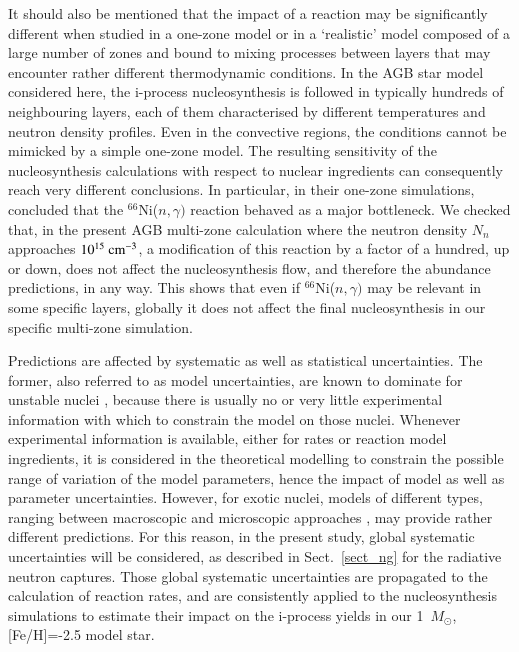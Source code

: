 \documentclass{aa}
\def\Msun{$M_{\odot}$}
\begin{document}
It should also be mentioned that the impact of a reaction may be significantly different when studied in a one-zone model or in a `realistic' model composed of a large number of zones and bound to mixing processes between layers that may encounter rather different thermodynamic conditions. In the AGB star model considered here, the i-process nucleosynthesis is followed in typically hundreds of neighbouring layers, each of them characterised by different temperatures and neutron density profiles. Even in the convective regions, the conditions cannot be mimicked by a simple one-zone model. The resulting sensitivity of the nucleosynthesis calculations with respect to nuclear ingredients can consequently reach very different conclusions. In particular, in their one-zone simulations, \citet{McKay19} concluded that the $^{66}$Ni($n,\gamma)$ reaction behaved as a major bottleneck. We checked that, in the present AGB
multi-zone calculation where the neutron density $N_n$ approaches $10^{15}~\rm{cm}^{-3}$,
a modification  of this reaction by a factor of a hundred, up or down,
does not affect the nucleosynthesis  flow, and therefore the
abundance predictions,  in any way. This shows that even if $^{66}$Ni($n,\gamma)$ may be relevant in some specific layers, globally it does not affect the final nucleosynthesis in our specific multi-zone simulation.

Predictions are affected by systematic as well as statistical uncertainties. The former, also referred to as model uncertainties, are known to dominate for unstable nuclei \citep[e.g.][]{Goriely14a}, because there is usually no or very little experimental information with which to constrain the model on those nuclei. Whenever experimental information is available, either for rates or reaction model ingredients, it is considered in the theoretical modelling to constrain the possible range of variation of the model parameters, hence the impact of model as well as parameter uncertainties. However, for exotic nuclei, models of different types, ranging between macroscopic and microscopic approaches \citep[e.g.][]{Arnould07,Goriely15b,Hilaire16, Goriely17a}, may provide rather different predictions.
For this reason, in the present study, global systematic uncertainties will be considered, as described in Sect.~\ref{sect_ng} for the radiative neutron captures. Those global systematic uncertainties are propagated to the calculation of reaction rates, and are consistently applied to the nucleosynthesis simulations to estimate their impact on the i-process yields in our  1~\Msun{}, [Fe/H]=-2.5 model star.
\end{document}
